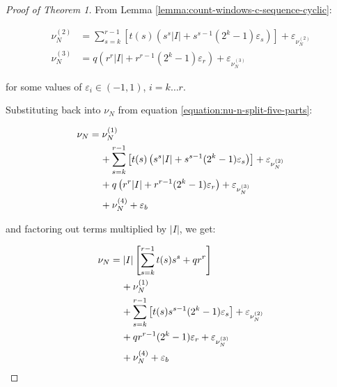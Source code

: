 \documentclass[11pt,a4paper]{tesis}
\theoremstyle{plain}
\theoremstyle{definition}
\begin{document}
\begin{proof}[Proof of Theorem 1]
  From Lemma \ref{lemma:count-windows-c-sequence-cyclic}:

  \begin{equation*}
    \begin{aligned}
      \nu^{(2)}_N & = \sum_{s = k}^{r - 1} \left[ t(s) \left( s^s |I| + s^{s - 1} (2^k - 1) \varepsilon_s \right) \right] + \varepsilon_{\nu^{(2)}_N} \\
      \nu^{(3)}_N & = q \left( r^r |I| + r^{r - 1} (2^k - 1) \varepsilon_r \right)  + \varepsilon_{\nu^{(3)}_N}
    \end{aligned}
  \end{equation*}

  for some values of $\varepsilon_i \in (-1, 1)$, $i = k \dots r$.

  Substituting back into $\nu_N$ from equation \ref{equation:nu-n-split-five-parts}:

  \begin{equation*}
    \begin{aligned}
      \nu_N
        & = \nu^{(1)}_N \\
        & \hspace*{4mm} + \sum_{s = k}^{r - 1} \left[ t(s) \left( s^s |I| + s^{s - 1} (2^k - 1) \varepsilon_s \right) \right] + \varepsilon_{\nu^{(2)}_N} \\
        & \hspace*{4mm} + q \left( r^r |I| + r^{r - 1} (2^k - 1) \varepsilon_r \right)  + \varepsilon_{\nu^{(3)}_N} \\
        & \hspace*{4mm} + \nu^{(4)}_N + \varepsilon_b
    \end{aligned}
  \end{equation*}

  and factoring out terms multiplied by $|I|$, we get:

  \begin{equation*}
    \begin{aligned}
      \nu_N
        & = |I| \left[ \sum_{s = k}^{r - 1} t(s) s^s + q r^r \right] \\
        & \hspace*{4mm} + \nu^{(1)}_N \\
        & \hspace*{4mm} + \sum_{s = k}^{r - 1} \left[ t(s) s^{s - 1} (2^k - 1) \varepsilon_s \right] + \varepsilon_{\nu^{(2)}_N} \\
        & \hspace*{4mm} + q r^{r - 1} (2^k - 1) \varepsilon_r  + \varepsilon_{\nu^{(3)}_N} \\
        & \hspace*{4mm} + \nu^{(4)}_N + \varepsilon_b
    \end{aligned}
  \end{equation*}


\end{proof}
\end{document}
